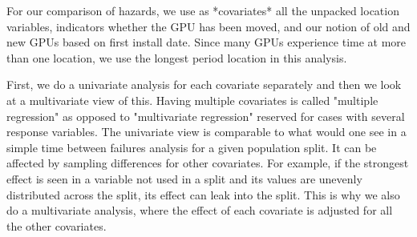 For our comparison of hazards, we use as *covariates* all the unpacked
location variables, indicators whether the GPU has been moved, and our
notion of old and new GPUs based on first install date. Since many
GPUs experience time at more than one location, we use the longest
period location in this analysis. 

First, we do a univariate analysis for each covariate separately and
then we look at a multivariate view of this. Having multiple
covariates is called "multiple regression" as opposed to "multivariate
regression" reserved for cases with several response variables. The
univariate view is comparable to what would one see in a simple time
between failures analysis for a given population split. It can be
affected by sampling differences for other covariates. For example, if
the strongest effect is seen in a variable not used in a split and its
values are unevenly distributed across the split, its effect can leak
into the split. This is why we also do a multivariate analysis, where
the effect of each covariate is adjusted for all the other
covariates. 
 

